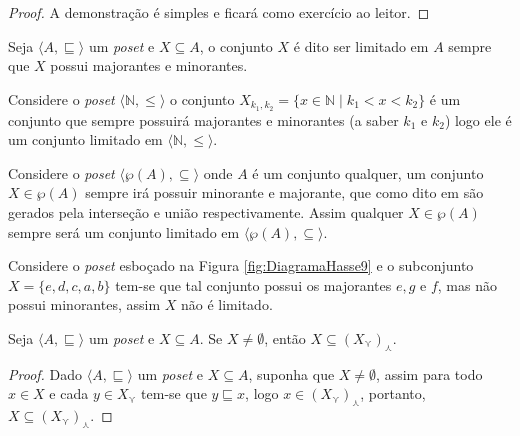 \begin{proof}
	A demonstração é simples e ficará como exercício ao leitor. 
\end{proof}

\begin{definition}\label{def:ConjuntoLimitadoPoset}
	Seja $\langle A, \sqsubseteq \rangle$ um \textit{poset} e $X \subseteq A$, o conjunto $X$ é dito ser limitado em $A$ sempre que $X$ possui majorantes e minorantes.
\end{definition}

\begin{example}
	Considere o \textit{poset} $\langle \mathbb{N}, \leq \rangle$ o conjunto $X_{k_1, k_2} = \{x \in \mathbb{N} \mid k_1 < x < k_2\}$ é um conjunto que sempre possuirá majorantes e minorantes (a saber $k_1$ e $k_2$) logo ele é um conjunto limitado em $\langle \mathbb{N}, \leq \rangle$.
\end{example}

\begin{example}
	Considere o \textit{poset} $\langle \wp(A), \subseteq \rangle$ onde $A$ é um conjunto qualquer, um conjunto $X \in \wp(A)$ sempre irá possuir minorante e majorante, que como dito em \cite{abe1991-TC} são gerados pela interseção e união respectivamente. Assim qualquer $X \in \wp(A)$ sempre será um conjunto limitado em $\langle \wp(A), \subseteq \rangle$.
\end{example}

\begin{example}
	Considere o \textit{poset} esboçado na Figura \ref{fig:DiagramaHasse9} e o subconjunto $X = \{e, d, c, a , b\}$ tem-se que tal conjunto possui os majorantes $e, g$ e $f$, mas não possui minorantes, assim $X$ não é limitado.
\end{example}

\begin{theorem}\label{teo:MinoranteMajoranteInclusao}
	Seja $\langle A, \sqsubseteq \rangle$ um \textit{poset} e $X \subseteq A$. Se $X \neq \emptyset$, então $X \subseteq (X_\curlyvee)_\curlywedge$.
\end{theorem}

\begin{proof}
	Dado $\langle A, \sqsubseteq \rangle$ um \textit{poset} e $X \subseteq A$, suponha que $X \neq \emptyset$, assim para todo $x \in X$ e cada $y \in X_\curlyvee$ tem-se que $y \sqsubseteq x$, logo $x \in (X_\curlyvee)_\curlywedge$, portanto, $X \subseteq (X_\curlyvee)_\curlywedge$.
\end{proof}

